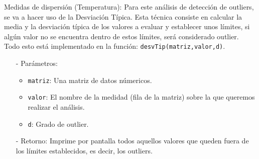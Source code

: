 \documentclass[a4paper, 12pt]{article}
\begin{document}
			\item Medidas de dispersión (Temperatura): Para este análisis de detección de outliers, se va a hacer uso de la Desviación Típica. Esta técnica consiste en calcular la media y la desviación típica de los valores a evaluar y establecer unos límites, si algún valor no se encuentra dentro de estos límites, será considerado outlier. \\
			Todo esto está implementado en la función: \texttt{desvTip(matriz,valor,d)}.
			\begin{itemize}
				\item[-] Parámetros:
				\begin{itemize}
					\item \texttt{matriz}: Una matriz de datos númericos.
					\item \texttt{valor}: El nombre de la medidad (fila de la matriz) sobre la que queremos realizar el análisis.
					\item \texttt{d}: Grado de outlier.
				\end{itemize}
				
				\item[-] Retorno: Imprime por pantalla todos aquellos valores que queden fuera de los límites establecidos, es decir, los outliers.
				

\end{itemize}
\end{document}
